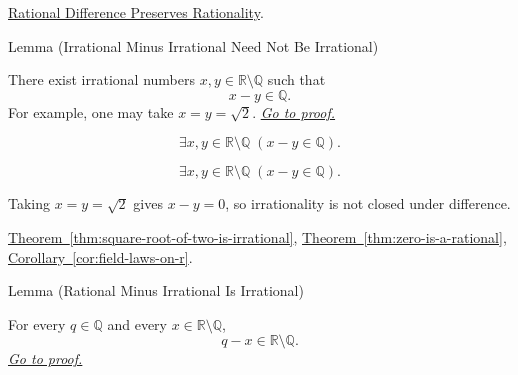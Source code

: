 \begin{dependencies}
\hyperref[lem:rational-difference-preserves-rationality]{Rational Difference Preserves Rationality}.
\end{dependencies}

\begin{lemmabox}{Lemma (Irrational Minus Irrational Need Not Be Irrational)}
\begin{lemma}
\label{lem:irrational-minus-irrational-need-not-be-irrational}
There exist irrational numbers $x,y\in\mathbb{R}\setminus\mathbb{Q}$ such
that
\[
  x-y\in\mathbb{Q}.
\]
For example, one may take $x=y=\sqrt{2}$.
\hyperref[prf:irrational-minus-irrational-need-not-be-irrational]{\textit{Go to proof.}}
\end{lemma}
\end{lemmabox}

\begin{remark*}
\[
\exists x,y\in\mathbb{R}\setminus\mathbb{Q}\;(x-y\in\mathbb{Q}).
\]
\end{remark*}

\begin{remark*}
\[
\exists x,y\in\mathbb{R}\setminus\mathbb{Q}\;(x-y\in\mathbb{Q}).
\]
\end{remark*}

\begin{remark*}[Interpretation]
Taking $x=y=\sqrt{2}$ gives $x-y=0$, so irrationality is not closed under
difference.
\end{remark*}

\begin{dependencies}
\hyperref[thm:square-root-of-two-is-irrational]{Theorem~\ref*{thm:square-root-of-two-is-irrational}},
\hyperref[thm:zero-is-a-rational]{Theorem~\ref*{thm:zero-is-a-rational}},
\hyperref[cor:field-laws-on-r]{Corollary~\ref*{cor:field-laws-on-r}}.
\end{dependencies}

\begin{lemmabox}{Lemma (Rational Minus Irrational Is Irrational)}
\begin{lemma}
\label{lem:rational-minus-irrational-is-irrational}
For every $q\in\mathbb{Q}$ and every $x\in\mathbb{R}\setminus\mathbb{Q}$,
\[
  q-x\in\mathbb{R}\setminus\mathbb{Q}.
\]
\hyperref[prf:rational-minus-irrational-is-irrational]{\textit{Go to proof.}}
\end{lemma}
\end{lemmabox}

